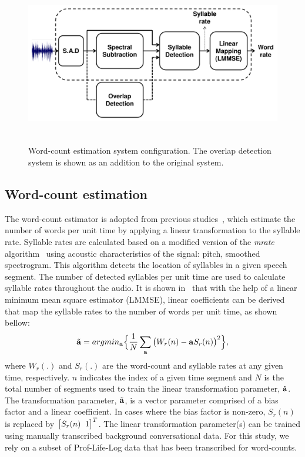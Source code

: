 \begin{figure}[t!]
	\centering
	\includegraphics[height = 2.8in, width=1\textwidth]{figures/wce_ovl_SLT2014_systemconfig_figur-crop}
	\vspace{-3mm}
	\caption{Word-count estimation system configuration. The overlap detection system is shown as an addition to the original system.}
	\label{fig:wce_system_overview}
\end{figure}

\subsection{Word-count estimation}
\label{sec:wce}
The word-count estimator is adopted from previous studies~\cite{IS14_wce}, which estimate the number of words per unit time by applying a linear transformation to the syllable rate. 
Syllable rates are calculated based on a modified version of the {\it mrate} algorithm~\cite{Wang_slbl} using acoustic characteristics of the signal: pitch, smoothed spectrogram. 
This algorithm detects the location of syllables in a given speech segment. 
The number of detected syllables per unit time are used to calculate syllable rates throughout the audio. 
It is shown in~\cite{IS14_wce} that with the help of a linear minimum mean square estimator (LMMSE), linear coefficients can be derived that map the syllable rates to the number of words per unit time, as shown bellow: 
\begin{equation}
\label{eq:lmmse_wce}
{\tilde {\bf a}} = argmin_{\bf a} \Big\{\frac{1}{N}\sum_{\bf a}\big(W_r(n)-{\bf a}S_r(n)\big)^2\Big\},
\vspace{-1mm}
\end{equation}
where $W_r(.)$ and $S_r(.)$ are the word-count and syllable rates at any given time, respectively. 
$n$ indicates the index of a given time segment and $N$ is the total number of segments used to train the linear transformation parameter, ${\tilde {\bf a}}$. 
The transformation parameter, ${\tilde {\bf a}}$, is a vector parameter comprised of a bias factor and a linear coefficient. 
In cases where the bias factor is non-zero, $S_r(n)$ is replaced by $\big[S_r(n) \hspace{2mm} 1\big]^T$. 
The linear transformation parameter(s) can be trained using manually transcribed background conversational data. 
For this study, we rely on a subset of Prof-Life-Log data that has been transcribed for word-counts. 

